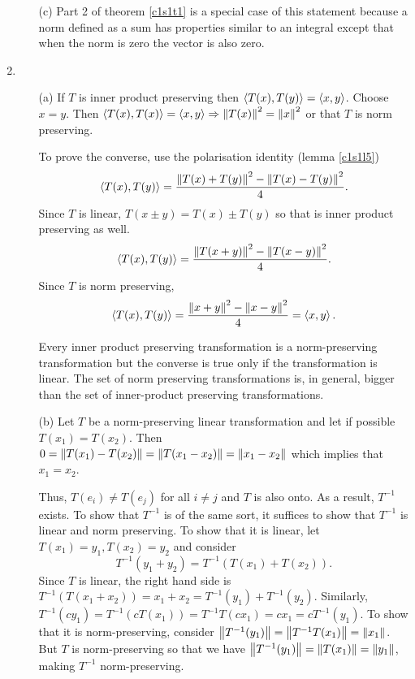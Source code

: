 \begin{enumerate}
\begin{enumerate}
\item[(c)] Part 2 of theorem \ref{c1s1t1} is a special case of this statement
because a norm defined as a sum has properties similar to an integral except
that when the norm is zero the vector is also zero.
\end{enumerate}

\item
\begin{enumerate}
\item[(a)] If $T$ is inner product preserving then $\left\langle{T(x), T(y)}\right\rangle=\left\langle{x, y}\right\rangle$.
Choose $x = y$. Then $\left\langle{T(x), T(x)}\right\rangle = \left\langle{x, y}\right\rangle \Rightarrow \left\Vert{T(x)}\right\Vert^2 =
\left\Vert{x}\right\Vert^2$ or that $T$ is norm preserving.

To prove the converse, use the polarisation identity (lemma \ref{c1s1l5})
\[
\left\langle{T(x), T(y)}\right\rangle = \frac{\left\Vert{T(x) + T(y)}\right\Vert^2 - \left\Vert{T(x) - T(y)}\right\Vert^2}{4}.
\]
Since $T$ is linear, $T(x \pm y) = T(x) \pm T(y)$ so that
is inner product preserving as well.
\[
\left\langle{T(x), T(y)}\right\rangle = \frac{\left\Vert{T(x + y)}\right\Vert^2 - \left\Vert{T(x - y)}\right\Vert^2}{4}.
\]
Since $T$ is norm preserving,
\[
\left\langle{T(x), T(y)}\right\rangle = \frac{\left\Vert{x + y}\right\Vert^2 - \left\Vert{x - y}\right\Vert^2}{4} = \left\langle{x, y}\right\rangle.
\]

\begin{rem}
Every inner product preserving transformation is a norm-preserving 
transformation but the converse is true only if the transformation is linear.
The set of norm preserving transformations is, in general, bigger than the
set of inner-product preserving transformations.
\end{rem}

\item[(b)] Let $T$ be a norm-preserving linear transformation and let if 
possible $T(x_1) = T(x_2)$. Then $0 = \left\Vert{T(x_1) - T(x_2)}\right\Vert = 
\left\Vert{T(x_1 - x_2)}\right\Vert = \left\Vert{x_1 - x_2}\right\Vert$ which implies that $x_1 = x_2$.

Thus, $T(e_i) \ne T(e_j)$ for all $i \ne j$ and $T$ is also onto. As a result,
$T^{-1}$ exists. To show that $T^{-1}$ is of the same sort, it suffices to show
that $T^{-1}$ is linear and norm preserving. To show that it is linear, let
$T(x_1) = y_1, T(x_2) = y_2$ and consider
\[
T^{-1}(y_1 + y_2) = T^{-1}(T(x_1) + T(x_2)).
\]
Since $T$ is linear, the right hand side is $T^{-1}(T(x_1 + x_2)) = x_1 + x_2
= T^{-1}(y_1) + T^{-1}(y_2)$. Similarly, $T^{-1}(cy_1) = T^{-1}(cT(x_1)) = 
T^{-1}T(cx_1) = cx_1 = cT^{-1}(y_1)$. To show that it is norm-preserving,
consider $\left\Vert{T^{-1}(y_1)}\right\Vert = \left\Vert{T^{-1}T(x_1)}\right\Vert = \left\Vert{x_1}\right\Vert$. But $T$ is
norm-preserving so that we have $\left\Vert{T^{-1}(y_1)}\right\Vert=\left\Vert{T(x_1)}\right\Vert=\left\Vert{y_1}\right\Vert$,
making $T^{-1}$ norm-preserving.
\end{enumerate}


\end{enumerate}
